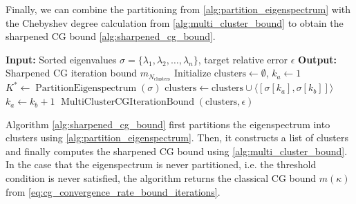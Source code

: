 Finally, we can combine the partitioning from \cref{alg:partition_eigenspectrum} with the Chebyshev degree calculation from \cref{alg:multi_cluster_bound} to obtain the sharpened CG bound \cref{alg:sharpened_cg_bound}.
\begin{algorithm}[H]
    \caption{$\operatorname{SharpenedCGIterationBound}(\sigma, \epsilon)$}
    \begin{algorithmic}[1]
        \State \textbf{Input:} Sorted eigenvalues $\sigma = \{\lambda_1, \lambda_2, \ldots, \lambda_n\}$, target relative error $\epsilon$
        \State \textbf{Output:} Sharpened CG iteration bound $m_{N_{\text{clusters}}}$
        \State Initialize $\text{clusters} \gets \emptyset$, $k_a \gets 1$
        \State $K^* \gets \operatorname{PartitionEigenspectrum}(\sigma)$
        \State $\text{clusters} \gets \text{clusters} \cup \langle[\sigma[k_a], \sigma[k_b]]\rangle$
        \State $k_a \gets k_b + 1$
        \EndFor
        \State \Return $\operatorname{MultiClusterCGIterationBound}(\text{clusters}, \epsilon)$
    \end{algorithmic}
    \label{alg:sharpened_cg_bound}
\end{algorithm}
Algorithm \ref{alg:sharpened_cg_bound} first partitions the eigenspectrum into clusters using \cref{alg:partition_eigenspectrum}. Then, it constructs a list of clusters and finally computes the sharpened CG bound using \cref{alg:multi_cluster_bound}. In the case that the eigenspectrum is never partitioned, i.e. the threshold condition is never satisfied, the algorithm returns the classical CG bound $m(\kappa)$ from \cref{eq:cg_convergence_rate_bound_iterations}.